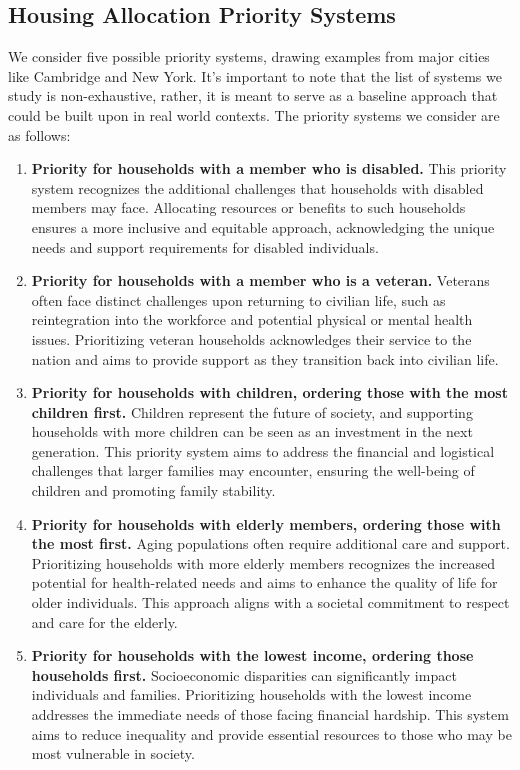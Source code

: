 \documentclass[11pt]{article}
\begin{document}
\subsection{Housing Allocation Priority Systems}
We consider five possible priority systems, drawing examples from major cities like Cambridge and New York. It's important to note that the list of systems we study is non-exhaustive, rather, it is meant to serve as a baseline approach that could be built upon in real world contexts. The priority systems we consider are as follows:
\begin{enumerate}
    \item \textbf{Priority for households with a member who is disabled.} This priority system recognizes the additional challenges that households with disabled members may face. Allocating resources or benefits to such households ensures a more inclusive and equitable approach, acknowledging the unique needs and support requirements for disabled individuals.
    \item \textbf{Priority for households with a member who is a veteran.} Veterans often face distinct challenges upon returning to civilian life, such as reintegration into the workforce and potential physical or mental health issues. Prioritizing veteran households acknowledges their service to the nation and aims to provide support as they transition back into civilian life.
    \item \textbf{Priority for households with children, ordering those with the most children first.} Children represent the future of society, and supporting households with more children can be seen as an investment in the next generation. This priority system aims to address the financial and logistical challenges that larger families may encounter, ensuring the well-being of children and promoting family stability.
    \item \textbf{Priority for households with elderly members, ordering those with the most first.} Aging populations often require additional care and support. Prioritizing households with more elderly members recognizes the increased potential for health-related needs and aims to enhance the quality of life for older individuals. This approach aligns with a societal commitment to respect and care for the elderly.
    \item \textbf{Priority for households with the lowest income, ordering those households first.} Socioeconomic disparities can significantly impact individuals and families. Prioritizing households with the lowest income addresses the immediate needs of those facing financial hardship. This system aims to reduce inequality and provide essential resources to those who may be most vulnerable in society.
\end{enumerate}
\end{document}

